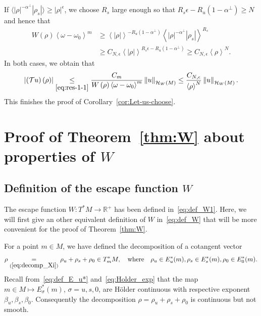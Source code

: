 \documentclass[AHL,Unicode,longabstracts,published]{cedram}
\newcommand*\eq[1]{\underset{(#1)}{=}}
\newcommand{\clT}{\mathcal{T}}
\newcommand{\clH}{\mathcal{H}}
\newcommand{\bbR}{\mathbb{R}}
\newcommand{\clH}{\mathcal{H}}
\newcommand{\bbR}{\mathbb{R}}
\begin{document}
If $\langle |\rho|^{-\alpha^{\perp}}|\rho_{s}|\rangle \geq|\rho|^{\epsilon}$, we choose $R_{s}$ large enough so that $R_{s}\epsilon-R_{u}(1-\alpha^{\perp})\geq N$ and hence that
\begin{align*}
W\left(\rho\right)\left\langle \omega-\omega_{0}\right\rangle ^{m}&\geq\left\langle \left|\rho\right|\right\rangle ^{-R_{u}\left(1-\alpha^{\perp}\right)}\left\langle \left|\rho\right|^{-\alpha^{\perp}}\left|\rho_{s}\right|\right\rangle ^{R_{s}}\\
&\geq C_{N,\epsilon}\left\langle \left|\rho\right|\right\rangle ^{R_{s}\epsilon-R_{u}\left(1-\alpha^{\perp}\right)}\geq C_{N,\epsilon}\left\langle \rho\right\rangle ^{N}.
\end{align*}
In both cases, we obtain that
\[
\left|\left(\clT u\right)\left(\rho\right)\right|\underset{\eqref{eq:res-1-1}}{\leq}\frac{C_{m}}{W\left(\rho\right)\left\langle \omega-\omega_{0}\right\rangle ^{m}}\left\Vert u\right\Vert _{\clH _{W}\left(M\right)}\leq\frac{C_{N,\epsilon}}{\left\langle \rho\right\rangle ^{N}}\left\Vert u\right\Vert _{\clH _{W}\left(M\right)}.
\]
This finishes the proof of Corollary~\ref{cor:Let-us-choose}.
\clearpage

\appendix

\section{Proof of Theorem~\ref{thm:W} about properties of \texorpdfstring{$W$}{W}}\label{subsec:Proof-of-Thm}

\subsection{Definition of the escape function \texorpdfstring{$W$}{W}}

The escape function $W:T^{*}M\rightarrow\bbR^{+}$ has been defined in~\eqref{eq:def_W1}. Here, we will first give an other equivalent definition of $W$ in~\eqref{eq:def_W} that will be more convenient for the proof of Theorem~\ref{thm:W}.

For a point $m\in M$, we have defined the decomposition of a cotangent vector 
\[
\rho\eq{\ref{eq:decomp_Xi}}\rho_{u}+\rho_{s}+\rho_{0}\in T_{m}^{*}M,\quad\text{where}\quad\rho_{u}\in E_{u}^{*}(m),\rho_{s}\in E_{s}^{*}(m),\rho_{0}\in E_{0}^{*}(m).
\]
Recall from~\eqref{eq:def_E_u*} and~\eqref{eq:Holder_exp} that the map $m\in M\mapsto E_{\sigma}^{*}(m)$, $\sigma=u,s,0$, are H\"older continuous with respective exponent $\beta_{u},\beta_{s},\beta_{0}$. Consequently the decomposition $\rho=\rho_{u}+\rho_{s}+\rho_{0}$ is continuous but not smooth.
\end{document}
